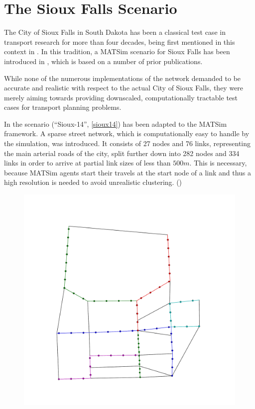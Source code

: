 \section{The Sioux Falls Scenario}
\label{sec:sioux}

The City of Sioux Falls in South Dakota has been a classical test case in transport
research for more than four decades, being first mentioned in this context in
\citet{Morlok1973}. In this tradition, a MATSim scenario for Sioux Falls has been
introduced in \citet{Chakirov2014}, which is based on a number of prior publications.

While none of the numerous implementations of the network demanded to be accurate
and realistic with respect to the actual City of Sioux Falls, they were merely aiming
towards providing downscaled, computationally tractable test cases for transport
planning problems.

In \citet{Chakirov2014} the scenario (``Sioux-14'', \cref{sioux14}) has been
adapted to the MATSim framework. A sparse street network, which is computationally
easy to handle by the simulation, was introduced. It consists of 27 nodes and 76 links,
representing the main arterial roads of the city, split further down into
282 nodes and 334 links in order to arrive at partial link sizes of less than $500m$.
This is necessary, because MATSim agents start their travels at the start node
of a link and thus a high resolution is needed to avoid unrealistic clustering.
()

\begin{figure}
    \centering
    \includegraphics[width=\textwidth]{figures/sioux14_pt.pdf}
    \caption{}
    \label{fig:sioux14}
\end{figure}

